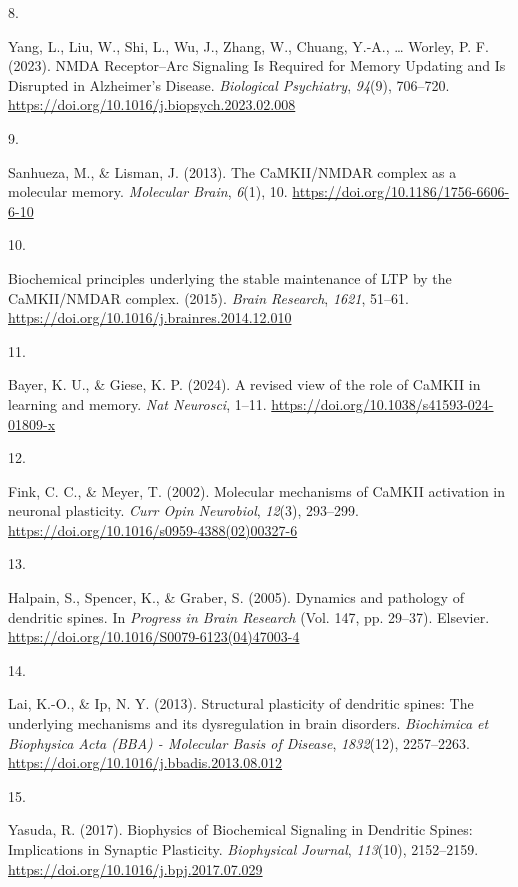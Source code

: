 \documentclass[
  11pt,
  letterpaper,
]{scrreprt}
\newlength{\cslhangindent}
\newlength{\csllabelwidth}
\newenvironment{CSLReferences}[2] %
 {\begin{list}{}{%
  \setlength{\itemindent}{0pt}
  \setlength{\leftmargin}{0pt}
  \setlength{\parsep}{0pt}
  \ifodd #1
   \setlength{\leftmargin}{\cslhangindent}
   \setlength{\itemindent}{-1\cslhangindent}
  \fi
  \setlength{\itemsep}{#2\baselineskip}}}
 {\end{list}}
\newcommand{\CSLLeftMargin}[1]{\parbox[t]{\csllabelwidth}{\strut#1\strut}}
\newcommand{\CSLRightInline}[1]{\parbox[t]{\linewidth - \csllabelwidth}{\strut#1\strut}}
\begin{document}
\begin{CSLReferences}{0}{0}
\CSLLeftMargin{8. }%
\CSLRightInline{Yang, L., Liu, W., Shi, L., Wu, J., Zhang, W., Chuang,
Y.-A., \ldots{} Worley, P. F. (2023). {NMDA Receptor}--{Arc Signaling Is
Required} for {Memory Updating} and {Is Disrupted} in {Alzheimer}'s
{Disease}. \emph{Biological Psychiatry}, \emph{94}(9), 706--720.
\url{https://doi.org/10.1016/j.biopsych.2023.02.008}}

\CSLLeftMargin{9. }%
\CSLRightInline{Sanhueza, M., \& Lisman, J. (2013). The {CaMKII}/{NMDAR}
complex as a molecular memory. \emph{Molecular Brain}, \emph{6}(1), 10.
\url{https://doi.org/10.1186/1756-6606-6-10}}

\CSLLeftMargin{10. }%
\CSLRightInline{Biochemical principles underlying the stable maintenance
of {LTP} by the {CaMKII}/{NMDAR} complex. (2015). \emph{Brain Research},
\emph{1621}, 51--61.
\url{https://doi.org/10.1016/j.brainres.2014.12.010}}

\CSLLeftMargin{11. }%
\CSLRightInline{Bayer, K. U., \& Giese, K. P. (2024). A revised view of
the role of {CaMKII} in learning and memory. \emph{Nat Neurosci}, 1--11.
\url{https://doi.org/10.1038/s41593-024-01809-x}}

\CSLLeftMargin{12. }%
\CSLRightInline{Fink, C. C., \& Meyer, T. (2002). Molecular mechanisms
of {CaMKII} activation in neuronal plasticity. \emph{Curr Opin
Neurobiol}, \emph{12}(3), 293--299.
\url{https://doi.org/10.1016/s0959-4388(02)00327-6}}

\CSLLeftMargin{13. }%
\CSLRightInline{Halpain, S., Spencer, K., \& Graber, S. (2005). Dynamics
and pathology of dendritic spines. In \emph{Progress in {Brain
Research}} (Vol. 147, pp. 29--37). Elsevier.
\url{https://doi.org/10.1016/S0079-6123(04)47003-4}}

\CSLLeftMargin{14. }%
\CSLRightInline{Lai, K.-O., \& Ip, N. Y. (2013). Structural plasticity
of dendritic spines: {The} underlying mechanisms and its dysregulation
in brain disorders. \emph{Biochimica et Biophysica Acta (BBA) -
Molecular Basis of Disease}, \emph{1832}(12), 2257--2263.
\url{https://doi.org/10.1016/j.bbadis.2013.08.012}}

\CSLLeftMargin{15. }%
\CSLRightInline{Yasuda, R. (2017). Biophysics of {Biochemical Signaling}
in {Dendritic Spines}: {Implications} in {Synaptic Plasticity}.
\emph{Biophysical Journal}, \emph{113}(10), 2152--2159.
\url{https://doi.org/10.1016/j.bpj.2017.07.029}}


\end{CSLReferences}
\end{document}
